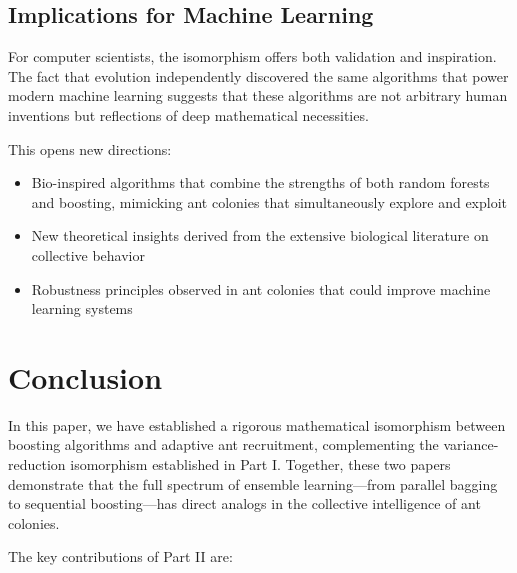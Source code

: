 \documentclass[12pt,letterpaper]{article}
\begin{document}
\subsection{Implications for Machine Learning}

For computer scientists, the isomorphism offers both validation and inspiration. The fact that evolution independently discovered the same algorithms that power modern machine learning suggests that these algorithms are not arbitrary human inventions but reflections of deep mathematical necessities.

This opens new directions:
\begin{itemize}
    \item Bio-inspired algorithms that combine the strengths of both random forests and boosting, mimicking ant colonies that simultaneously explore and exploit
    \item New theoretical insights derived from the extensive biological literature on collective behavior
    \item Robustness principles observed in ant colonies that could improve machine learning systems
\end{itemize}

\section{Conclusion}

In this paper, we have established a rigorous mathematical isomorphism between boosting algorithms and adaptive ant recruitment, complementing the variance-reduction isomorphism established in Part I. Together, these two papers demonstrate that the full spectrum of ensemble learning—from parallel bagging to sequential boosting—has direct analogs in the collective intelligence of ant colonies.

The key contributions of Part II are:
\end{document}
